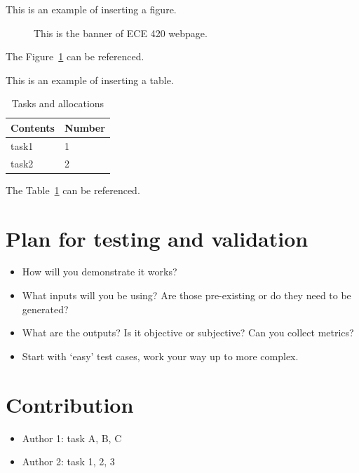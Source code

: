 \documentclass[journal,onecolumn, draftclsnofoot, 12pt]{IEEEtran}
\begin{document}
This is an example of inserting a figure. 
\begin{figure}[h]
\begin{center}
\caption{ This is the banner of ECE 420 webpage.  } 
\label{fig:banner}
\end{center}
\end{figure}
The Figure~\ref{fig:banner} can be referenced. 


This is an example of inserting a table.
\begin{table}[h]
\small
    \centering
    \begin{tabular}{|p{1.5in}|p{1.5in}|}
        \hline
        \textbf{Contents} & \textbf{Number} \\
         \hline
        task1 &  1\\
        \hline
        task2 &  2 \\
         \hline
         
    \end{tabular}
    \vspace{0.1in}
    \caption{Tasks and allocations}
    \label{tab:table}
\end{table}
The Table~\ref{tab:table} can be referenced. 


\section{Plan for testing and validation}
\begin{itemize}
    \item How will you demonstrate it works?
    \item What inputs will you be using?  Are those pre-existing or do they need to be generated?
    \item What are the outputs?  Is it objective or subjective?  Can you collect metrics?
    \item Start with ‘easy’ test cases, work your way up to more complex. 
\end{itemize}

\section{Contribution}
\begin{itemize}
    \item Author 1: task A, B, C
    \item Author 2: task 1, 2, 3
\end{itemize}



 


\end{document}
